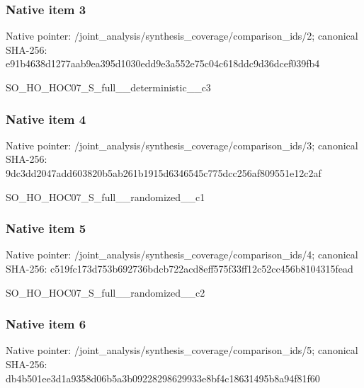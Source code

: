 \documentclass[10pt,a4paper]{article}
\begin{document}
\subsubsection{Native item 3}
Native pointer: /joint\_\allowbreak{}analysis/synthesis\_\allowbreak{}coverage/comparison\_\allowbreak{}ids/2; canonical SHA-256: e91b4638d1277aab9ea395d1030edd9e3a552e75c04c618ddc9d36dcef039fb4

\begingroup\raggedright\sloppy SO\_\allowbreak{}HO\_\allowbreak{}HOC07\_\allowbreak{}S\_\allowbreak{}full\_\allowbreak{}\_\allowbreak{}deterministic\_\allowbreak{}\_\allowbreak{}c3\par\endgroup

\subsubsection{Native item 4}
Native pointer: /joint\_\allowbreak{}analysis/synthesis\_\allowbreak{}coverage/comparison\_\allowbreak{}ids/3; canonical SHA-256: 9dc3dd2047add603820b5ab261b1915d6346545c775dcc256af809551e12c2af

\begingroup\raggedright\sloppy SO\_\allowbreak{}HO\_\allowbreak{}HOC07\_\allowbreak{}S\_\allowbreak{}full\_\allowbreak{}\_\allowbreak{}randomized\_\allowbreak{}\_\allowbreak{}c1\par\endgroup

\subsubsection{Native item 5}
Native pointer: /joint\_\allowbreak{}analysis/synthesis\_\allowbreak{}coverage/comparison\_\allowbreak{}ids/4; canonical SHA-256: c519fc173d753b692736bdcb722acd8eff575f33ff12c52cc456b8104315fead

\begingroup\raggedright\sloppy SO\_\allowbreak{}HO\_\allowbreak{}HOC07\_\allowbreak{}S\_\allowbreak{}full\_\allowbreak{}\_\allowbreak{}randomized\_\allowbreak{}\_\allowbreak{}c2\par\endgroup

\subsubsection{Native item 6}
Native pointer: /joint\_\allowbreak{}analysis/synthesis\_\allowbreak{}coverage/comparison\_\allowbreak{}ids/5; canonical SHA-256: db4b501ee3d1a9358d06b5a3b09228298629933e8bf4c18631495b8a94f81f60
\end{document}
